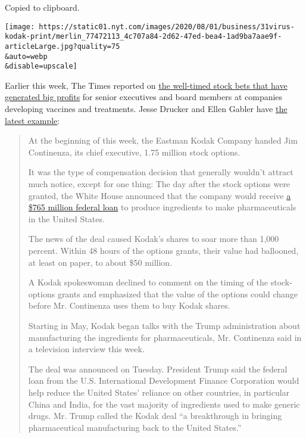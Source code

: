 Copied to clipboard.

\texttt{[image: https://static01.nyt.com/images/2020/08/01/business/31virus-kodak-print/merlin\_77472113\_4c707a84-2d62-47ed-bea4-1ad9ba7aae9f-articleLarge.jpg?quality=75\\\&auto=webp\\\&disable=upscale]}

Earlier this week, The Times reported on
\href{https://www.nytimes.com/2020/07/25/business/coronavirus-vaccine-profits-vaxart.html}{the
well-timed stock bets that have generated big profits} for senior
executives and board members at companies developing vaccines and
treatments. Jesse Drucker and Ellen Gabler have
\href{https://www.nytimes.com/2020/07/31/business/kodak-ceo-stock-options.html}{the
latest example}:

\begin{quote}
At the beginning of this week, the Eastman Kodak Company handed Jim
Continenza, its chief executive, 1.75 million stock options.

It was the type of compensation decision that generally wouldn't attract
much notice, except for one thing: The day after the stock options were
granted, the White House announced that the company would receive
\href{https://www.nytimes.com/live/2020/07/28/business/stock-market-today-coronavirus\#the-united-states-will-lend-kodak-765-million-to-make-drug-components}{a
\$765 million federal loan} to produce ingredients to make
pharmaceuticals in the United States.

The news of the deal caused Kodak's shares to soar more than 1,000
percent. Within 48 hours of the options grants, their value had
ballooned, at least on paper, to about \$50 million.

A Kodak spokeswoman declined to comment on the timing of the
stock-options grants and emphasized that the value of the options could
change before Mr. Continenza uses them to buy Kodak shares.

Starting in May, Kodak began talks with the Trump administration about
manufacturing the ingredients for pharmaceuticals, Mr. Continenza said
in a television interview this week.

The deal was announced on Tuesday. President Trump said the federal loan
from the U.S. International Development Finance Corporation would help
reduce the United States' reliance on other countries, in particular
China and India, for the vast majority of ingredients used to make
generic drugs. Mr. Trump called the Kodak deal ``a breakthrough in
bringing pharmaceutical manufacturing back to the United States.''
\end{quote}


